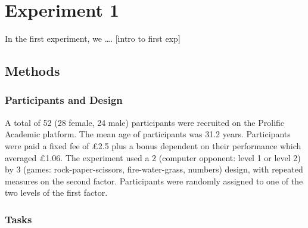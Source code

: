 \documentclass[
  english,
  man,floatsintext]{apa6}
\begin{document}
\hypertarget{experiment-1}{%
\section{Experiment 1}\label{experiment-1}}

In the first experiment, we \ldots. {[}intro to first exp{]}

\hypertarget{methods}{%
\subsection{Methods}\label{methods}}

\hypertarget{participants-and-design}{%
\subsubsection{Participants and Design}\label{participants-and-design}}

A total of 52 (28 female, 24 male) participants were recruited on the Prolific Academic platform. The mean age of participants was 31.2 years. Participants were paid a fixed fee of £2.5 plus a bonus dependent on their performance which averaged £1.06. The experiment used a 2 (computer opponent: level 1 or level 2) by 3 (games: rock-paper-scissors, fire-water-grass, numbers) design, with repeated measures on the second factor. Participants were randomly assigned to one of the two levels of the first factor.

\hypertarget{tasks}{%
\subsubsection{Tasks}\label{tasks}}
\end{document}
